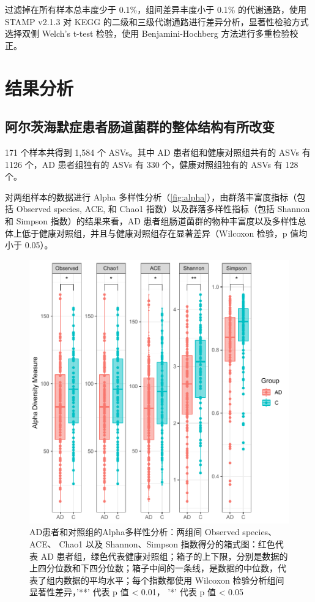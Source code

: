 \documentclass[supercite]{HustGraduPaper}
\begin{document}
过滤掉在所有样本总丰度少于 0.1\%，组间差异丰度小于 0.1\% 的代谢通路，使用 STAMP\cite{parks2014stamp} v2.1.3 对 KEGG 的二级和三级代谢通路进行差异分析，显著性检验方式选择双侧 Welch's t-test 检验，使用 Benjamini-Hochberg 方法进行多重检验校正。


\section{结果分析}
\subsection{阿尔茨海默症患者肠道菌群的整体结构有所改变}
171 个样本共得到 1,584 个 ASVs。其中 AD 患者组和健康对照组共有的 ASVs 有 1126 个，AD 患者组独有的 ASVs 有 330 个，健康对照组独有的 ASVs 有 128 个。

对两组样本的数据进行 Alpha 多样性分析（\autoref{fig:alpha}），由群落丰富度指标（包括 Observed species, ACE, 和 Chao1 指数）以及群落多样性指标（包括 Shannon 和 Simpson 指数）的结果来看，AD 患者组肠道菌群的物种丰富度以及多样性总体上低于健康对照组，并且与健康对照组存在显著差异（Wilcoxon 检验，p 值均小于 0.05）。

\begin{figure}[htb]
	\centering
	\includegraphics[scale=0.6]{plot/alpha.pdf}
	\caption{AD患者和对照组的Alpha多样性分析：两组间 Observed species、 ACE、 Chao1 以及 Shannon、Simpson 指数得分的箱式图：红色代表 AD 患者组，绿色代表健康对照组；箱子的上下限，分别是数据的上四分位数和下四分位数；箱子中间的一条线，是数据的中位数，代表了组内数据的平均水平；每个指数都使用 Wilcoxon 检验分析组间显著性差异，'**' 代表 p 值 < 0.01， '*' 代表 p 值 < 0.05 }
	\label{fig:alpha}
\end{figure}
\end{document}

